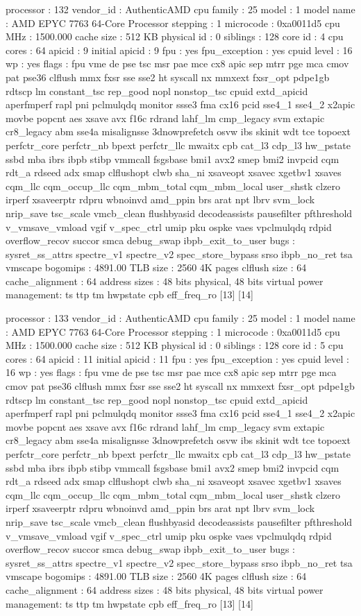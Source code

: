 processor	: 132
vendor_id	: AuthenticAMD
cpu family	: 25
model		: 1
model name	: AMD EPYC 7763 64-Core Processor
stepping	: 1
microcode	: 0xa0011d5
cpu MHz		: 1500.000
cache size	: 512 KB
physical id	: 0
siblings	: 128
core id		: 4
cpu cores	: 64
apicid		: 9
initial apicid	: 9
fpu		: yes
fpu_exception	: yes
cpuid level	: 16
wp		: yes
flags		: fpu vme de pse tsc msr pae mce cx8 apic sep mtrr pge mca cmov pat pse36 clflush mmx fxsr sse sse2 ht syscall nx mmxext fxsr_opt pdpe1gb rdtscp lm constant_tsc rep_good nopl nonstop_tsc cpuid extd_apicid aperfmperf rapl pni pclmulqdq monitor ssse3 fma cx16 pcid sse4_1 sse4_2 x2apic movbe popcnt aes xsave avx f16c rdrand lahf_lm cmp_legacy svm extapic cr8_legacy abm sse4a misalignsse 3dnowprefetch osvw ibs skinit wdt tce topoext perfctr_core perfctr_nb bpext perfctr_llc mwaitx cpb cat_l3 cdp_l3 hw_pstate ssbd mba ibrs ibpb stibp vmmcall fsgsbase bmi1 avx2 smep bmi2 invpcid cqm rdt_a rdseed adx smap clflushopt clwb sha_ni xsaveopt xsavec xgetbv1 xsaves cqm_llc cqm_occup_llc cqm_mbm_total cqm_mbm_local user_shstk clzero irperf xsaveerptr rdpru wbnoinvd amd_ppin brs arat npt lbrv svm_lock nrip_save tsc_scale vmcb_clean flushbyasid decodeassists pausefilter pfthreshold v_vmsave_vmload vgif v_spec_ctrl umip pku ospke vaes vpclmulqdq rdpid overflow_recov succor smca debug_swap ibpb_exit_to_user
bugs		: sysret_ss_attrs spectre_v1 spectre_v2 spec_store_bypass srso ibpb_no_ret tsa vmscape
bogomips	: 4891.00
TLB size	: 2560 4K pages
clflush size	: 64
cache_alignment	: 64
address sizes	: 48 bits physical, 48 bits virtual
power management: ts ttp tm hwpstate cpb eff_freq_ro [13] [14]

processor	: 133
vendor_id	: AuthenticAMD
cpu family	: 25
model		: 1
model name	: AMD EPYC 7763 64-Core Processor
stepping	: 1
microcode	: 0xa0011d5
cpu MHz		: 1500.000
cache size	: 512 KB
physical id	: 0
siblings	: 128
core id		: 5
cpu cores	: 64
apicid		: 11
initial apicid	: 11
fpu		: yes
fpu_exception	: yes
cpuid level	: 16
wp		: yes
flags		: fpu vme de pse tsc msr pae mce cx8 apic sep mtrr pge mca cmov pat pse36 clflush mmx fxsr sse sse2 ht syscall nx mmxext fxsr_opt pdpe1gb rdtscp lm constant_tsc rep_good nopl nonstop_tsc cpuid extd_apicid aperfmperf rapl pni pclmulqdq monitor ssse3 fma cx16 pcid sse4_1 sse4_2 x2apic movbe popcnt aes xsave avx f16c rdrand lahf_lm cmp_legacy svm extapic cr8_legacy abm sse4a misalignsse 3dnowprefetch osvw ibs skinit wdt tce topoext perfctr_core perfctr_nb bpext perfctr_llc mwaitx cpb cat_l3 cdp_l3 hw_pstate ssbd mba ibrs ibpb stibp vmmcall fsgsbase bmi1 avx2 smep bmi2 invpcid cqm rdt_a rdseed adx smap clflushopt clwb sha_ni xsaveopt xsavec xgetbv1 xsaves cqm_llc cqm_occup_llc cqm_mbm_total cqm_mbm_local user_shstk clzero irperf xsaveerptr rdpru wbnoinvd amd_ppin brs arat npt lbrv svm_lock nrip_save tsc_scale vmcb_clean flushbyasid decodeassists pausefilter pfthreshold v_vmsave_vmload vgif v_spec_ctrl umip pku ospke vaes vpclmulqdq rdpid overflow_recov succor smca debug_swap ibpb_exit_to_user
bugs		: sysret_ss_attrs spectre_v1 spectre_v2 spec_store_bypass srso ibpb_no_ret tsa vmscape
bogomips	: 4891.00
TLB size	: 2560 4K pages
clflush size	: 64
cache_alignment	: 64
address sizes	: 48 bits physical, 48 bits virtual
power management: ts ttp tm hwpstate cpb eff_freq_ro [13] [14]

